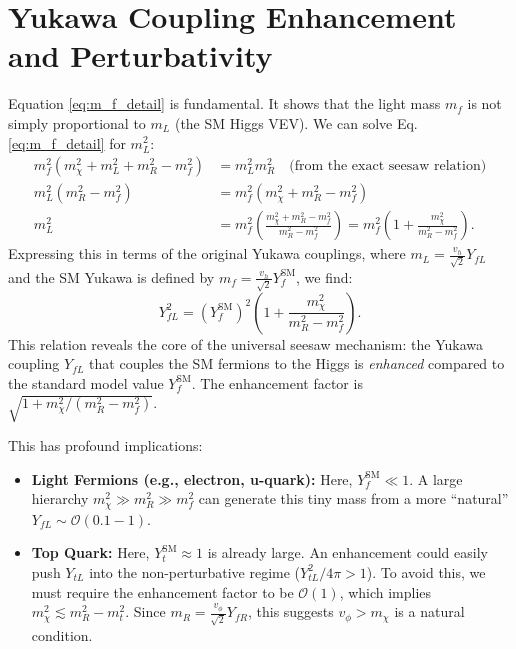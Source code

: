 \section{Yukawa Coupling Enhancement and Perturbativity}
Equation \eqref{eq:m_f_detail} is fundamental. It shows that the light mass $m_f$ is not simply proportional to $m_L$ (the SM Higgs VEV). We can solve Eq. \eqref{eq:m_f_detail} for $m_L^2$:
\begin{align*}
m_f^2 (m_{\chi}^2 + m_L^2 + m_R^2 - m_f^2) &= m_L^2 m_R^2 \quad \text{(from the exact seesaw relation)} \\
m_L^2 (m_R^2 - m_f^2) &= m_f^2 (m_{\chi}^2 + m_R^2 - m_f^2) \\
m_L^2 &= m_f^2 \left( \frac{m_{\chi}^2 + m_R^2 - m_f^2}{m_R^2 - m_f^2} \right) = m_f^2 \left( 1 + \frac{m_{\chi}^2}{m_R^2 - m_f^2} \right). \label{eq:m_L_solution_detail}
\end{align*}
Expressing this in terms of the original Yukawa couplings, where $m_L = \frac{v_h}{\sqrt{2}} Y_{fL}$ and the SM Yukawa is defined by $m_f = \frac{v_h}{\sqrt{2}} Y_f^{\text{SM}}$, we find:
\begin{equation}
Y_{fL}^2 = (Y_f^{\text{SM}})^2 \left( 1 + \frac{m_{\chi}^2}{m_R^2 - m_f^2} \right). \label{eq:Y_L_enhanced_detail}
\end{equation}
This relation reveals the core of the universal seesaw mechanism: the Yukawa coupling $Y_{fL}$ that couples the SM fermions to the Higgs is \textit{enhanced} compared to the standard model value $Y_f^{\text{SM}}$. The enhancement factor is $\sqrt{1 + m_{\chi}^2/(m_R^2 - m_f^2)}$.

This has profound implications:
\begin{itemize}
    \item \textbf{Light Fermions (e.g., electron, u-quark):} Here, $Y_f^{\text{SM}} \ll 1$. A large hierarchy $m_{\chi}^2 \gg m_R^2 \gg m_f^2$ can generate this tiny mass from a more ``natural'' $Y_{fL} \sim \mathcal{O}(0.1-1)$.
    \item \textbf{Top Quark:} Here, $Y_t^{\text{SM}} \approx 1$ is already large. An enhancement could easily push $Y_{tL}$ into the non-perturbative regime ($Y_{tL}^2 / 4\pi > 1$). To avoid this, we must require the enhancement factor to be $\mathcal{O}(1)$, which implies $m_{\chi}^2 \lesssim m_R^2 - m_t^2$. Since $m_R = \frac{v_\phi}{\sqrt{2}} Y_{fR}$, this suggests $v_\phi > m_{\chi}$ is a natural condition.
\end{itemize}

